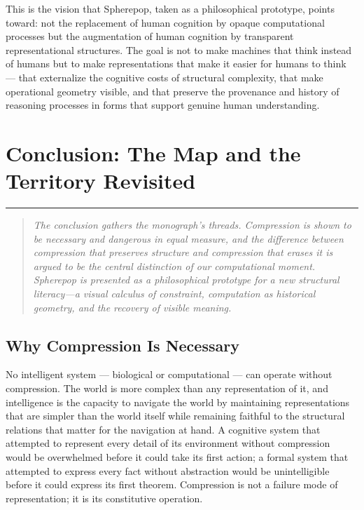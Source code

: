 \documentclass[12pt,openany]{book}
\theoremstyle{plain}
\theoremstyle{definition}
\theoremstyle{remark}
\newcommand{\chapterrule}{%
  \vspace{4pt}%
  {\color{SpherepopBlue}\rule{\textwidth}{0.8pt}}%
  \vspace{10pt}%
}
\newenvironment{chapterprecis}{%
  \begin{quote}\small\itshape}{%
  \end{quote}\medskip}
\begin{document}
This is the vision that Spherepop, taken as a philosophical prototype, points toward: not the replacement of human cognition by opaque computational processes but the augmentation of human cognition by transparent representational structures. The goal is not to make machines that think instead of humans but to make representations that make it easier for humans to think — that externalize the cognitive costs of structural complexity, that make operational geometry visible, and that preserve the provenance and history of reasoning processes in forms that support genuine human understanding.

 \clearpage

\chapter*{Conclusion: The Map and the Territory Revisited}
\chapterrule

\begin{chapterprecis}
The conclusion gathers the monograph's threads. Compression is
shown to be necessary and dangerous in equal measure, and the
difference between compression that preserves structure and
compression that erases it is argued to be the central
distinction of our computational moment. Spherepop is presented
as a philosophical prototype for a new structural literacy---a
visual calculus of constraint, computation as historical
geometry, and the recovery of visible meaning.
\end{chapterprecis}

\section*{Why Compression Is Necessary}

No intelligent system — biological or computational — can operate without compression. The world is more complex than any representation of it, and intelligence is the capacity to navigate the world by maintaining representations that are simpler than the world itself while remaining faithful to the structural relations that matter for the navigation at hand. A cognitive system that attempted to represent every detail of its environment without compression would be overwhelmed before it could take its first action; a formal system that attempted to express every fact without abstraction would be unintelligible before it could express its first theorem. Compression is not a failure mode of representation; it is its constitutive operation.
\end{document}
